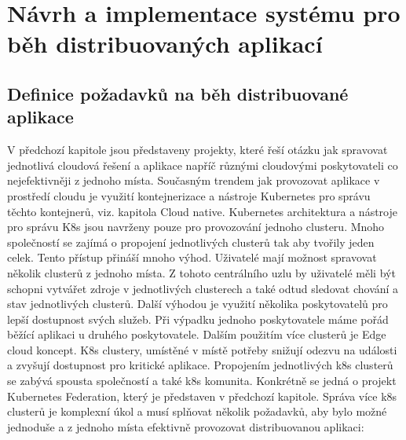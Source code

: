 \chapter{Návrh a implementace systému pro běh distribuovaných aplikací}
\section{Definice požadavků na běh distribuované aplikace}
V předchozí kapitole jsou představeny projekty, které řeší otázku jak spravovat jednotlivá cloudová řešení a aplikace napříč různými cloudovými poskytovateli co nejefektivněji z jednoho místa. Současným trendem jak provozovat aplikace v prostředí cloudu je využití kontejnerizace a nástroje Kubernetes pro správu těchto kontejnerů, viz. kapitola Cloud native. Kubernetes architektura a nástroje pro správu K8s jsou navrženy pouze pro provozování jednoho clusteru. Mnoho společností se zajímá \linebreak o propojení jednotlivých clusterů tak aby tvořily jeden celek. Tento přístup přináší mnoho výhod. Uživatelé mají možnost spravovat několik clusterů z jednoho místa. Z tohoto centrálního uzlu by uživatelé měli být schopni vytvářet zdroje v jednotlivých clusterech a také odtud sledovat chování a stav jednotlivých clusterů. Další výhodou je využití několika poskytovatelů pro lepší dostupnost svých služeb. Při výpadku jednoho poskytovatele máme pořád běžící aplikaci u druhého poskytovatele. Dalším použitím více clusterů je Edge cloud koncept. K8s clustery, umístěné v místě potřeby snižují odezvu na události a zvyšují dostupnost pro kritické aplikace. Propojením jednotlivých k8s clusterů se zabývá spousta společností a také k8s komunita. Konkrétně se jedná o projekt Kubernetes Federation, který je představen v předchozí kapitole.
     Správa více k8s clusterů je komplexní úkol a musí splňovat několik požadavků, aby bylo možné jednoduše a z jednoho místa efektivně provozovat distribuovanou aplikaci: 
